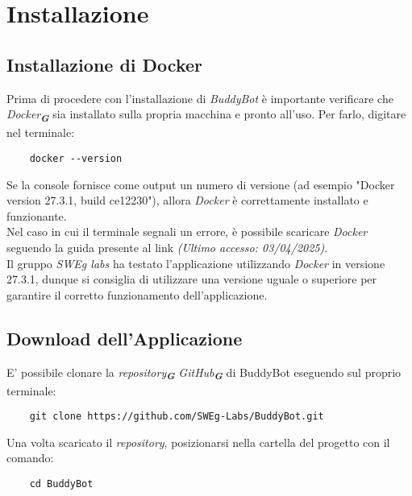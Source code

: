 

\section{Installazione}
\label{sec:installazione}

\subsection{Installazione di Docker}
Prima di procedere con l'installazione di \textit{BuddyBot} è importante verificare che \emph{Docker}\textsubscript{\textbf{\textit{G}}} sia installato sulla propria macchina e pronto all'uso.  
Per farlo, digitare nel terminale:
\begin{verbatim}
    docker --version
\end{verbatim}
Se la console fornisce come output un numero di versione (ad esempio "Docker version 27.3.1, build ce12230"), allora \emph{Docker} è
correttamente
installato e funzionante.\\
Nel caso in cui il terminale segnali un errore, è possibile scaricare \emph{Docker} seguendo la guida presente al link
\emph{(Ultimo accesso: 03/04/2025)}.\\
Il gruppo \emph{SWEg labs} ha testato l'applicazione utilizzando \emph{Docker} in versione 27.3.1, dunque si consiglia di utilizzare una
versione uguale o superiore per garantire il corretto funzionamento dell'applicazione.

\subsection{Download dell'Applicazione}
E' possibile clonare la \emph{repository}\textsubscript{\textbf{\textit{G}}} \emph{GitHub}\textsubscript{\textbf{\textit{G}}} di BuddyBot eseguendo sul proprio terminale:
\begin{verbatim}
    git clone https://github.com/SWEg-Labs/BuddyBot.git
\end{verbatim}
Una volta scaricato il \emph{repository}, posizionarsi nella cartella del progetto con il comando:
\begin{verbatim}
    cd BuddyBot
\end{verbatim}

